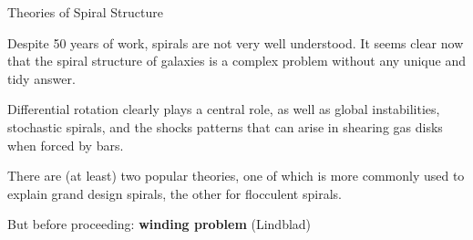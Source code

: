 \documentclass[letterpaper,landscape]{slides}
\begin{document}
\begin{slide}
\begin{center}
\vskip 0.1in
\end{center}



\vfill
\end{slide}



\begin{slide}

\begin{center}
{\large \color{red} Theories of Spiral Structure   }
\end{center}


Despite 50 years of work, spirals are not very well understood.
It seems clear now that {\color{blue} the spiral structure of galaxies 
is a complex problem} without any unique and tidy answer.

Differential rotation clearly plays a central role,
as well as global instabilities, stochastic spirals, and the shocks patterns that can 
arise in shearing gas disks when forced by bars.	

There are (at least) two popular theories, one of which is more commonly used to explain 
grand design spirals, the other for flocculent spirals.

But before proceeding: {\bf winding problem} (Lindblad)



\vfill
\end{slide}
\end{document}
